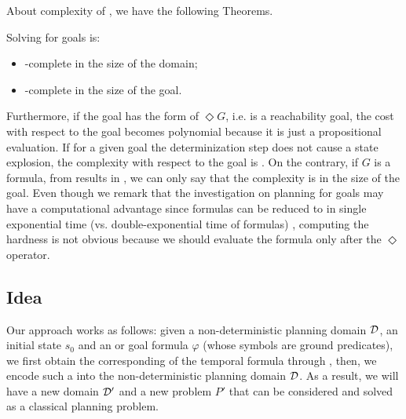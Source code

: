 About complexity of \FONDS, we have the following Theorems.

\begin{theorem}\citep{de2018automata}
\label{th:fond-ltlf-complex}
Solving \FONDS for \LTLf goals is:
\begin{itemize}
\item \EXPTIME-complete in the size of the domain;
\item \TWOEXPTIME-complete in the size of the goal.
\end{itemize}
\end{theorem}

Furthermore, if the goal has the form of $\Diamond G$, i.e. is a reachability goal, the cost with respect to the goal becomes polynomial because it is just a propositional evaluation. If for a given \LTLf goal the determinization step does not cause a state explosion,  the complexity with respect to the goal is \EXPTIME. 
On the contrary, if $G$ is a \PLTL formula, from results in \cite{de2018automata}, we can only say that the complexity is \TWOEXPTIME in the size of the goal.
Even though we remark that the investigation on planning for \PLTL goals may have a computational advantage since \PLTL formulas can be reduced to \DFA in single exponential time (vs. double-exponential time of \LTLf formulas) \citep{chandra1981acm}, computing the hardness is not obvious because we should evaluate the formula only after the $\Diamond$ operator.

\subsection{Idea}
Our \FONDFOR approach works as follows: given a non-deterministic planning domain $\mathcal{D}$, an initial state $s_0$ and an \LTLf or \PLTL goal formula $\varphi$ (whose symbols are ground predicates), we first obtain the corresponding \DFA of the temporal formula through \LTLfToDFA, then, we encode such a \DFA into the non-deterministic planning domain $\mathcal{D}$. As a result, we will have a new domain $\mathcal{D}'$ and a new problem $P'$ that can be considered and solved as a classical \FOND planning problem. 

